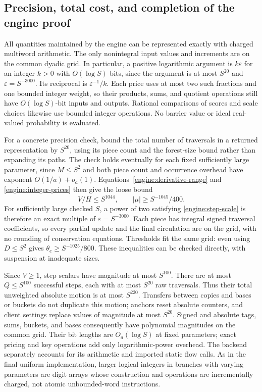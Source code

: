 \subsection{Precision, total cost, and completion of the engine proof}
\label{engine:implementation}

All quantities maintained by the engine can be represented exactly with
charged multiword arithmetic.  The only nonintegral input values and
increments are on the common dyadic grid.  In particular, a positive
logarithmic argument is $k\varepsilon$ for an integer $k>0$ with
$O(\log S)$ bits, since the argument is at most $S^{20}$ and
$\varepsilon=S^{-3000}$.  Its reciprocal is
$\varepsilon^{-1}/k$.  Each price uses at most two such fractions and
one bounded integer weight, so their products, sums, and quotient
operations still have $O(\log S)$-bit inputs and outputs.
Rational comparisons of scores and scale choices likewise use bounded
integer operations.  No barrier value or ideal real-valued probability
is evaluated.

For a concrete precision check, bound the total number of traversals in
a returned representation by $S^{20}$, using its piece count and the
forest-size bound rather than expanding its paths.  The check holds
eventually for each fixed sufficiently large parameter, since
$M\le S^2$ and both piece count and occurrence overhead have exponent
$O(1/a)+o_a(1)$.  Equations~\eqref{engine:derivative-range} and
\eqref{engine:integer-prices} then give the loose bound
\begin{equation}\label{engine:precision-bounds}
                 V/H\le S^{1044},\qquad
                 |\mu|\ge S^{-1045}/400.
\end{equation}
For sufficiently large checked $S$, a power of two satisfying
\eqref{engine:step-scale} is therefore an exact multiple of
$\varepsilon=S^{-3000}$.  Each piece has integral signed traversal
coefficients, so every partial update and the final circulation are on
the grid, with no rounding of conservation equations.  Thresholds fit
the same grid: even using $D\le S^2$ gives
$\theta_e\ge S^{-1025}/800$.  These inequalities can be checked
directly, with suspension at inadequate sizes.

Since $V\ge1$, step scalars have magnitude at most $S^{100}$.
There are at most $Q\le S^{100}$ successful steps, each with at most
$S^{20}$ raw traversals.  Thus their total unweighted absolute motion is
at most $S^{220}$.  Transfers between copies and bases or buckets do not
duplicate this motion; anchors reset absolute counters, and client
settings replace values of magnitude at most $S^{20}$.  Signed and
absolute tags, sums, buckets, and bases consequently have polynomial
magnitudes on the common grid.  Their bit lengths are $O_a(\log S)$ at
fixed parameters; exact pricing and key operations add only
logarithmic-power overhead.  The backend separately accounts
for its arithmetic and imported static flow calls.  As in the final
uniform implementation, larger logical integers in branches with varying
parameters are digit arrays whose construction and operations are
incrementally charged, not atomic unbounded-word instructions.

